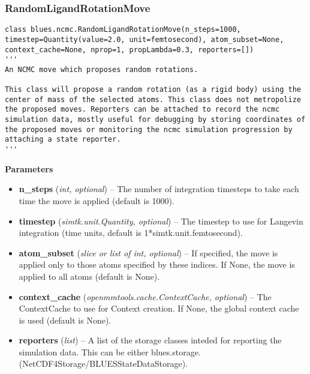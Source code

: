 \hypertarget{randomligandrotationmove}{%
\subsubsection{RandomLigandRotationMove}\label{randomligandrotationmove}}

\begin{verbatim}
class blues.ncmc.RandomLigandRotationMove(n_steps=1000, timestep=Quantity(value=2.0, unit=femtosecond), atom_subset=None, context_cache=None, nprop=1, propLambda=0.3, reporters=[])
'''
An NCMC move which proposes random rotations.

This class will propose a random rotation (as a rigid body) using the
center of mass of the selected atoms. This class does not metropolize
the proposed moves. Reporters can be attached to record the ncmc
simulation data, mostly useful for debugging by storing coordinates of
the proposed moves or monitoring the ncmc simulation progression by
attaching a state reporter.
'''
\end{verbatim}


\begin{description}
\item
    \textbf{Parameters}
\begin{itemize}
\item
  \textbf{n\_steps} (\emph{int, optional}) -- The number of integration
  timesteps to take each time the move is applied (default is 1000).
\item
  \textbf{timestep} (\emph{simtk.unit.Quantity, optional}) -- The
  timestep to use for Langevin integration (time units, default is
  1*simtk.unit.femtosecond).
\item
  \textbf{atom\_subset} (\emph{slice or list of int, optional}) -- If
  specified, the move is applied only to those atoms specified by these
  indices. If None, the move is applied to all atoms (default is None).
\item
  \textbf{context\_cache} (\emph{openmmtools.cache.ContextCache,
  optional}) -- The ContextCache to use for Context creation. If None,
  the global context cache is used (default is None).
\item
  \textbf{reporters} (\emph{list}) -- A list of the storage classes
  inteded for reporting the simulation data. This can be either
  blues.storage.(NetCDF4Storage/BLUESStateDataStorage).
\end{itemize}
\end{description}

